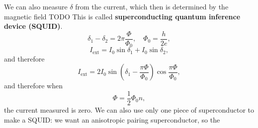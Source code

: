 \documentclass[hyperref, a4paper]{article}
\newcommand*{\concept}[1]{{\textbf{#1}}}
\begin{document}
We can also measure $\delta$ from the current,
which then is determined by the magnetic field TODO 
This is called \concept{superconducting quantum inference device (SQUID)}.
\begin{equation}
    \delta_1 - \delta_2 = 2\pi \frac{\Phi}{\Phi_0}, \quad 
    \Phi_0 = \frac{h}{2e},
\end{equation}
\begin{equation}
    I_{\text{ext}} = I_{0} \sin \delta_1 + I_0 \sin \delta_2,
\end{equation}
and therefore 
\begin{equation}
    I_{\text{ext}} = 2 I_0 \sin(\delta_1 - \frac{\pi \Phi}{\Phi_0}) \cos \frac{\pi \Phi}{\Phi_0},
\end{equation}
and therefore when 
\begin{equation}
    \Phi = \frac{1}{2} \Phi_0 n ,
\end{equation}
the current measured is zero.
We can also use only one piece of superconductor to make a SQUID:
we want an anisotropic pairing superconductor,
so the 



\printbibliography
\end{document}
